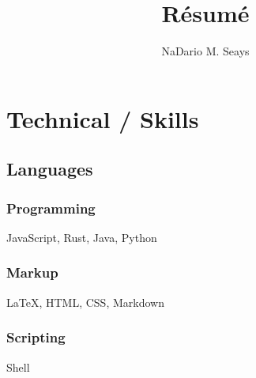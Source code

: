 \documentclass{article}
\begin{document}
\title{R\'esum\'e}
\author{NaDario M. Seays}

\maketitle
\section{Technical / Skills}
\subsection{Languages}
\subsubsection{Programming}
JavaScript, Rust, Java, Python

\subsubsection{Markup}
{\LaTeX}, HTML, CSS, Markdown

\subsubsection{Scripting}
Shell
\end{document}
